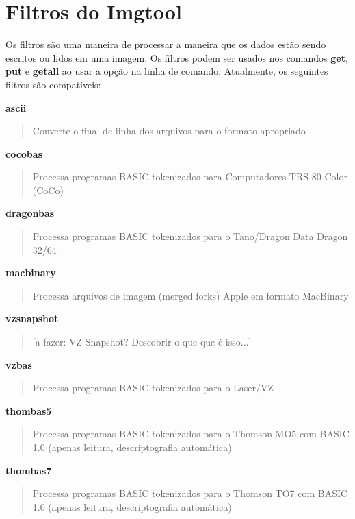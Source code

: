 \documentclass[letterpaper,10pt,brazil]{sphinxmanual}
\begin{document}
\section{Filtros do Imgtool}
\label{tools/imgtool:filtros-do-imgtool}
Os filtros são uma maneira de processar a maneira que os dados estão
sendo escritos ou lidos em uma imagem. Os filtros podem ser usados nos
comandos \textbf{get}, \textbf{put} e \textbf{getall} ao usar a opção 
na linha de comando. Atualmente, os seguintes filtros são compatíveis:

\textbf{ascii}
\begin{quote}

Converte o final de linha dos arquivos para o formato apropriado
\end{quote}

\textbf{cocobas}
\begin{quote}

Processa programas BASIC tokenizados para Computadores TRS-80 Color (CoCo)
\end{quote}

\textbf{dragonbas}
\begin{quote}

Processa programas BASIC tokenizados para o Tano/Dragon Data Dragon 32/64
\end{quote}

\textbf{macbinary}
\begin{quote}

Processa arquivos de imagem (merged forks) Apple em formato MacBinary
\end{quote}

\textbf{vzsnapshot}
\begin{quote}

{[}a fazer: VZ Snapshot? Descobrir o que que é isso...{]}
\end{quote}

\textbf{vzbas}
\begin{quote}

Processa programas BASIC tokenizados para o Laser/VZ
\end{quote}

\textbf{thombas5}
\begin{quote}

Processa programas BASIC tokenizados para o Thomson MO5 com BASIC 1.0 (apenas leitura, descriptografia automática)
\end{quote}

\textbf{thombas7}
\begin{quote}

Processa programas BASIC tokenizados para o Thomson TO7 com BASIC 1.0 (apenas leitura, descriptografia automática)
\end{quote}
\end{document}
